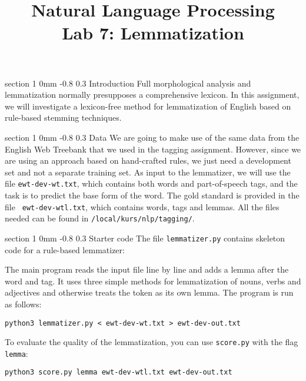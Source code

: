 \documentclass[11pt]{article}
\title{{\LARGE Natural Language Processing}\\[1.5mm]{\large Lab 7:
    Lemmatization}} \author{}
\date{} %
\makeatletter
\newcommand{\newsec}[2]{\section{#1}\label{sec:#2}\noindent}
\renewcommand{\section}{\@startsection
{section}%
{1}%
{0mm}%
{-0.8\baselineskip}%
{0.3\baselineskip}%
{\bfseries\large}}%
\makeatother
\begin{document}
 

\maketitle
\vspace{-2mm} \newsec{Introduction}{intro}%
Full morphological analysis and lemmatization normally presupposes a
comprehensive lexicon. In this assignment, we will investigate a
lexicon-free method for lemmatization of English based on rule-based
stemming techniques.

\newsec{Data}{data}%
We are going to make use of the same data from the English Web
Treebank that we used in the tagging assignment. However, since we are
using an approach based on hand-crafted rules, we just need a
development set and not a separate training set. As input to the
lemmatizer, we will use the file {\tt ewt-dev-wt.txt}, which contains
both words and part-of-speech tags, and the task is to predict the
base form of the word. The gold standard is provided in the file {\tt
  ewt-dev-wtl.txt}, which contains words, tags and lemmas.  All the
files needed can be found in {\tt /local/kurs/nlp/tagging/}.

\newsec{Starter code}{code}%
The file {\tt lemmatizer.py} contains skeleton code for a rule-based lemmatizer:
\begin{center}
\fbox{

}
\end{center}
The main program reads the input file line by line and adds a lemma
after the word and tag. It uses three simple methods for lemmatization
of nouns, verbs and adjectives and otherwise treats the token as its
own lemma. The program is run as follows:
\begin{verbatim}
python3 lemmatizer.py < ewt-dev-wt.txt > ewt-dev-out.txt
\end{verbatim}
To evaluate the quality of the lemmatization, you can use {\tt score.py} with the flag {\tt lemma}:
\begin{verbatim}
python3 score.py lemma ewt-dev-wtl.txt ewt-dev-out.txt
\end{verbatim}
\end{document}
